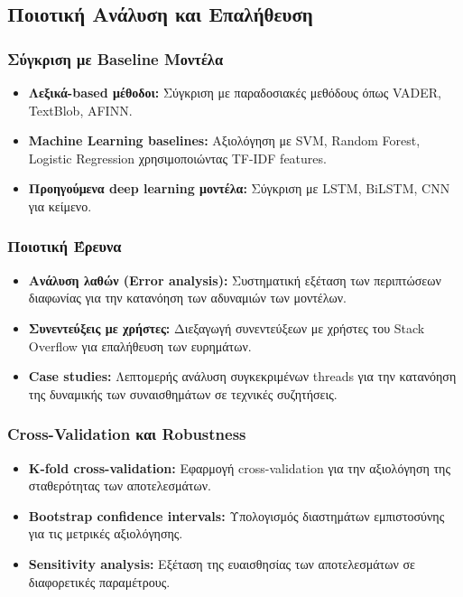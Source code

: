 \documentclass[a4paper,11pt,oneside,openany]{ioniothesis}
\begin{document}
\subsection{Ποιοτική Ανάλυση και Επαλήθευση}
\label{sec:Ποιοτική Ανάλυση και Επαλήθευση}

\subsubsection{Σύγκριση με Baseline Μοντέλα}

\begin{itemize}
    \item \textbf{Λεξικά-based μέθοδοι:} Σύγκριση με παραδοσιακές μεθόδους όπως VADER, TextBlob, AFINN.
    
    \item \textbf{Machine Learning baselines:} Αξιολόγηση με SVM, Random Forest, Logistic Regression χρησιμοποιώντας TF-IDF features.
    
    \item \textbf{Προηγούμενα deep learning μοντέλα:} Σύγκριση με LSTM, BiLSTM, CNN για κείμενο.
\end{itemize}

\subsubsection{Ποιοτική Έρευνα}

\begin{itemize}
    \item \textbf{Ανάλυση λαθών (Error analysis):} Συστηματική εξέταση των περιπτώσεων διαφωνίας για την κατανόηση των αδυναμιών των μοντέλων.
    
    \item \textbf{Συνεντεύξεις με χρήστες:} Διεξαγωγή συνεντεύξεων με χρήστες του Stack Overflow για επαλήθευση των ευρημάτων.
    
    \item \textbf{Case studies:} Λεπτομερής ανάλυση συγκεκριμένων threads για την κατανόηση της δυναμικής των συναισθημάτων σε τεχνικές συζητήσεις.
\end{itemize}

\subsubsection{Cross-Validation και Robustness}

\begin{itemize}
    \item \textbf{K-fold cross-validation:} Εφαρμογή cross-validation για την αξιολόγηση της σταθερότητας των αποτελεσμάτων.
    
    \item \textbf{Bootstrap confidence intervals:} Υπολογισμός διαστημάτων εμπιστοσύνης για τις μετρικές αξιολόγησης.
    
    \item \textbf{Sensitivity analysis:} Εξέταση της ευαισθησίας των αποτελεσμάτων σε διαφορετικές παραμέτρους.
\end{itemize}
\end{document}

